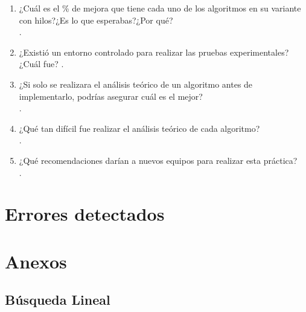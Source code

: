 \documentclass[12pt]{article}
\begin{document}
\begin{enumerate}
			        \item ¿Cuál es el \% de mejora que tiene cada uno de los algoritmos en su variante con hilos?¿Es lo que esperabas?¿Por qué?\\
			        .\\
			        
			        \item ¿Existió un entorno controlado para realizar las pruebas experimentales?¿Cuál fue?
			        .\\
			        
			        \item ¿Si solo se realizara el análisis teórico de un algoritmo antes de implementarlo, podrías asegurar cuál es el mejor?\\
			        .\\
			        
			        \item ¿Qué tan difícil fue realizar el análisis teórico de cada algoritmo?\\
			        .\\
			        
			        \item ¿Qué recomendaciones darían a nuevos equipos para realizar esta práctica?\\
			        .\\
			        
			    \end{enumerate}
	
	
	\section{Errores detectados}

\newpage


	\section{Anexos}

		\subsection{Búsqueda Lineal}
		    \inputminted{c++}{Code/Lineal.c}
		 
\end{document}
